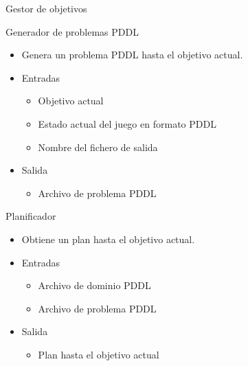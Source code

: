 \documentclass[11pt]{beamer}    %
\begin{document}
    \begin{frame}{Gestor de objetivos}
        \begin{figure}
            \centering
            \scalebox{0.7}{
                
            }
        \end{figure}
    \end{frame}

    \begin{frame}{Generador de problemas PDDL}
        \begin{itemize}
            \item Genera un problema PDDL hasta el objetivo actual.
            \item \alert{Entradas}
            \begin{itemize}
                \item Objetivo actual
                \item Estado actual del juego en formato PDDL
                \item Nombre del fichero de salida
            \end{itemize}
            \item \alert{Salida}
            \begin{itemize}
                \item Archivo de problema PDDL
            \end{itemize}
        \end{itemize}
    \end{frame}

    \begin{frame}{Planificador}
        \begin{itemize}
            \item Obtiene un plan hasta el objetivo actual.
            \item \alert{Entradas}
            \begin{itemize}
                \item Archivo de dominio PDDL
                \item Archivo de problema PDDL
            \end{itemize}
            \item \alert{Salida}
            \begin{itemize}
                \item Plan hasta el objetivo actual
            \end{itemize}
        \end{itemize}
    \end{frame}
\end{document}

